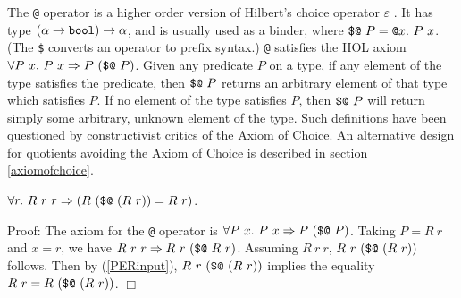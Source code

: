 \documentclass[envcountsame,runningheads]{llncs}
\begin{document}
The {\tt @} operator
is a higher order version of Hilbert's choice operator $\varepsilon$
\cite{GoMe93,Lei69}.
It has type $(\alpha \rightarrow \mbox{\tt bool}) \rightarrow \alpha$,
and is usually used as a binder,
where
$\mbox{\tt \$@}\ P = \mbox{\tt @}x.\ P\ x$.
(The {\tt \$} converts an operator to prefix syntax.)
{\tt @} satisfies the HOL axiom
$\forall P\ x.\ P\ x \Rightarrow P\ (\mbox{\tt \$@}\ P)$.
Given any predicate $P$ on a type,
if any element of the type satisfies the predicate, 
then $\mbox{\tt \$@}\ P$ returns an arbitrary element of
that type which satisfies $P$.
If no element of the type satisfies $P$,
then $\mbox{\tt \$@}\ P$ will return simply some
arbitrary,
unknown
element of the type.
%
%
Such definitions
have been questioned by constructivist critics of the Axiom of Choice.
An alternative design for quotients avoiding
the Axiom of Choice
is described in section \ref{axiomofchoice}.


\begin{lemma}
\label{ty_REL_SELECT_REL}
$\forall r.\ 
R\ r\ r \Rightarrow
(R\ (\mbox{\tt \$@} \ (R\ r)) = R\ r)$.
\end{lemma}
Proof:
The axiom for the {\tt @} operator is
$\forall P\ x.\ P\ x \Rightarrow P\ (\mbox{\tt \$@}\ P)$.
Taking $P = R\ r$ and $x = r$, we have
$R\ r\ r \Rightarrow R\ r\ (\mbox{\tt \$@}\ R\ r)$.
Assuming $R\ r\ r$,
$R\ r\ (\mbox{\tt \$@} \ (R\ r))$ follows.
Then
by (\ref{PERinput}),
$R\ r\ (\mbox{\tt \$@} \ (R\ r))$ implies the equality
$R\ r = R\ (\mbox{\tt \$@} \ (R\ r))$.
$\Box$
\end{document}
